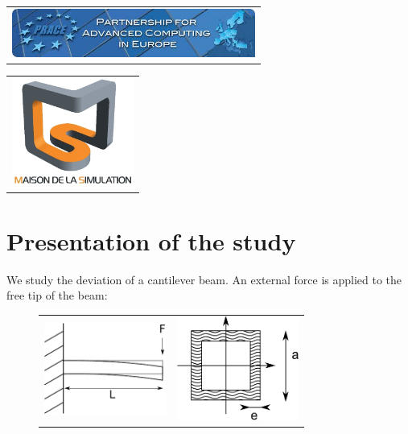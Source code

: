 \documentclass[11pt, french, A4wide]{article}
\theoremstyle{remark}
\theoremstyle{definition}
\begin{document}
\begin{minipage}{8cm}
  \begin{center}
    \begin{tabular}{c}
			\includegraphics[width=8cm]{Prace_long.jpg}
    \end{tabular}
  \end{center}
\end{minipage}
\hfill
\begin{minipage}{8cm}
  \begin{center}
    \begin{tabular}{c}
				\includegraphics[width=4cm]{logo_MDS.jpg}
    \end{tabular}
  \end{center}
\end{minipage}


\newpage
\section{Presentation of the study}

We study the deviation of a cantilever beam. An external force is applied to the free tip of the beam:

\begin{figure}[htbp]
  \begin{center}
    \begin{tabular}{cc}
\includegraphics[width=4cm]{poutre.pdf}
&
\includegraphics[width=4cm]{section.pdf}
    \end{tabular}
  \end{center}
\end{figure}
\end{document}
